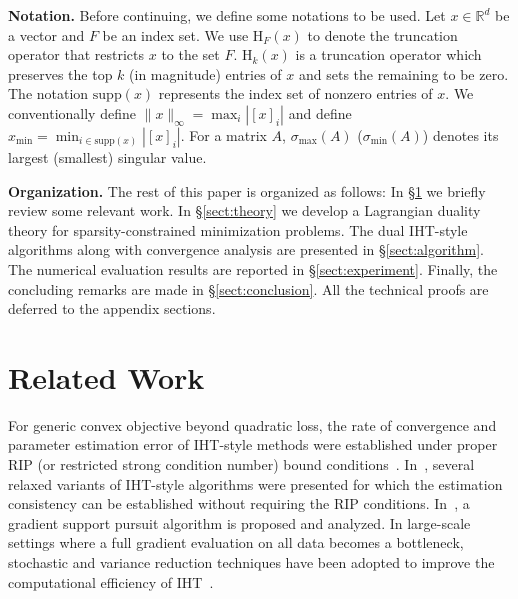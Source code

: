 \documentclass[11pt]{article}
\newcommand{\supp}{\text{supp}}
\numberwithin{equation}{section}
\numberwithin{table}{section}
\numberwithin{figure}{section}
\begin{document}
\noindent\textbf{Notation.} Before continuing, we define some notations to be used. Let $x \in \mathbb{R}^d$ be a vector and $F$ be an index set. We use $\mathrm{H}_F(x)$ to denote the truncation operator that restricts $x$ to the set $F$. $\mathrm{H}_k(x)$ is a truncation operator which preserves the top $k$ (in magnitude) entries of $x$ and sets the remaining to be zero. The notation $\supp(x)$ represents the index set of nonzero entries of $x$. We conventionally define $\|x\|_\infty = \max_{i}|[x]_i|$ and define $x_{\min}=\min_{i \in \supp(x)} |[x]_i|$. For a matrix $A$, $\sigma_{\max}(A)$ ($\sigma_{\min}(A)$) denotes its largest (smallest) singular value.

\noindent\textbf{Organization.} The rest of this paper is organized as follows: In \S\ref{sect:relatedwork} we briefly review some relevant work. In \S\ref{sect:theory} we develop a Lagrangian duality theory for sparsity-constrained minimization problems. The dual IHT-style algorithms along with convergence analysis are presented in \S\ref{sect:algorithm}. The numerical evaluation results are reported in \S\ref{sect:experiment}. Finally, the concluding remarks are made in \S\ref{sect:conclusion}. All the technical proofs are deferred to the appendix sections.

\section{Related Work}
\label{sect:relatedwork}
For generic convex objective beyond quadratic loss, the rate of convergence and parameter estimation error of IHT-style methods were established under proper RIP (or restricted strong condition number) bound conditions~\citep{Blumensath-TIT-2013,Yuan-ICML-2014,yuan2016exact}. In~\citep{jain2014iterative}, several relaxed variants of IHT-style algorithms were presented for which the estimation consistency can be established without requiring the RIP conditions. In~\citep{bahmani2013greedy}, a gradient support pursuit algorithm is proposed and analyzed. In large-scale settings where a full gradient evaluation on all data becomes a bottleneck, stochastic and variance reduction techniques have been adopted to improve the computational efficiency of IHT~\citep{nguyen2014linear,li2016stochastic,chen2016accelerated}.
\end{document}

